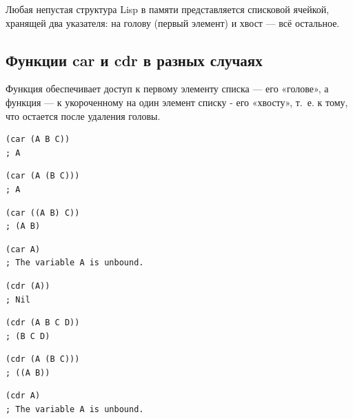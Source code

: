 \documentclass[a4paper]{report}
\begin{document}
Любая непустая структура Lisp в памяти представляется списковой ячейкой, хранящей два указателя: на
голову (первый элемент) и хвост — всё остальное.

\subsection*{Функции car и cdr в разных случаях}

Функция  обеспечивает доступ к первому элементу списка — его «голове», а функция  — к укороченному на один элемент списку - его «хвосту», т.~е. к тому, что остается после удаления головы.
\begin{AutoMultiColEnumerate}
	\item
\begin{lstlisting}[style=lispinline]
(car (A B C))
; A
\end{lstlisting}

	\item
\begin{lstlisting}[style=lispinline]
(car (A (B C)))
; A
\end{lstlisting}

	\item
\begin{lstlisting}[style=lispinline]
(car ((A B) C))
; (A B)
\end{lstlisting}

	\item
\begin{lstlisting}[style=lispinline]
(car A)
; The variable A is unbound.
\end{lstlisting}

	\item
\begin{lstlisting}[style=lispinline]
(cdr (A))
; Nil
\end{lstlisting}

	\item
\begin{lstlisting}[style=lispinline]
(cdr (A B C D))
; (B C D)
\end{lstlisting}

	\item
\begin{lstlisting}[style=lispinline]
(cdr (A (B C)))
; ((A B))
\end{lstlisting}

	\item
\begin{lstlisting}[style=lispinline]
(cdr A)
; The variable A is unbound.
\end{lstlisting}
\end{AutoMultiColEnumerate}
\end{document}
